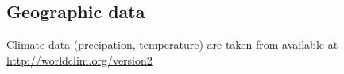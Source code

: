 \subsection{Geographic data}
Climate data (precipation, temperature)  are taken from \citet{fick_worldclim_2017} available at 
\url{http://worldclim.org/version2}
